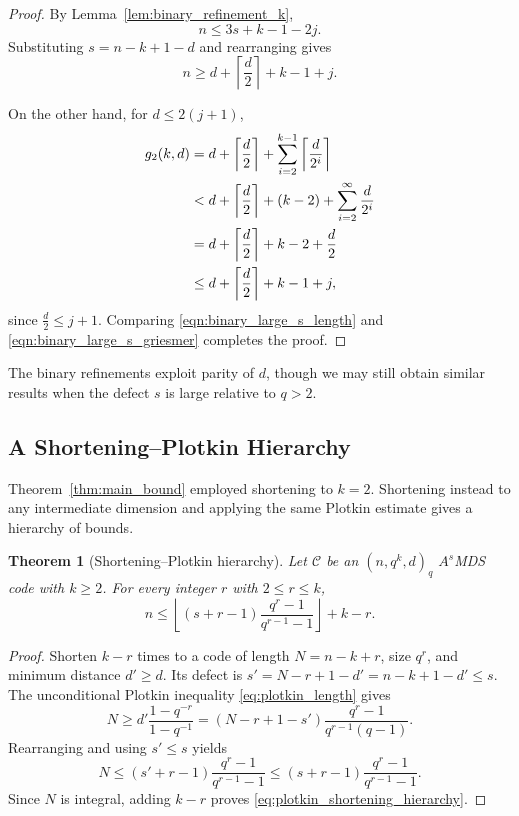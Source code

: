 \documentclass[12pt, letterpaper]{article}
\theoremstyle{plain}
\newtheorem{theorem}{Theorem}[section]
\theoremstyle{definition}
\begin{document}
\begin{proof}
	By Lemma~\ref{lem:binary_refinement_k},
	\[
	n \le 3s + k - 1 - 2j.
	\]
	Substituting $s = n - k + 1 - d$ and rearranging gives
	\begin{equation}\label{eqn:binary_large_s_length}
	n \ge d + \left\lceil\frac{d}{2}\right\rceil + k - 1 + j.
	\end{equation}

	On the other hand, for $d \le 2(j+1)$,
	\begin{align}
		g_2(k,d) &= d + \left\lceil\frac{d}{2}\right\rceil + \sum_{i=2}^{k-1} \left\lceil\frac{d}{2^i}\right\rceil \notag\\
		&< d + \left\lceil\frac{d}{2}\right\rceil + (k-2) + \sum_{i=2}^\infty \frac{d}{2^i} \notag\\
		&= d + \left\lceil\frac{d}{2}\right\rceil + k - 2 + \frac{d}{2} \notag\\
		&\le d + \left\lceil\frac{d}{2}\right\rceil + k - 1 + j, \label{eqn:binary_large_s_griesmer}
	\end{align}
	since $\frac{d}{2} \le j+1$. Comparing \eqref{eqn:binary_large_s_length} and \eqref{eqn:binary_large_s_griesmer} completes the proof.
\end{proof}

	The binary refinements exploit parity of $d$, though we may still obtain similar results when the defect $s$ is large relative to $q>2$.
	
	\subsection{A Shortening--Plotkin Hierarchy}
	\label{sec:large_defect}
	
	 Theorem~\ref{thm:main_bound} employed shortening to $k=2$. Shortening instead to any intermediate dimension and applying the same Plotkin estimate gives a hierarchy of bounds.

	\begin{theorem}[Shortening--Plotkin hierarchy]\label{thm:plotkin_shortening_hierarchy}
		Let $\mathcal C$ be an $(n,q^k,d)_q$ $A^s$MDS code with $k\ge2$. For every integer $r$ with $2\le r\le k$,
		\begin{equation}\label{eq:plotkin_shortening_hierarchy}
		 n\le
		 \left\lfloor (s+r-1)\frac{q^r-1}{q^{r-1}-1}\right\rfloor+k-r.
		\end{equation}
	\end{theorem}

	\begin{proof}
		Shorten $k-r$ times to a code of length $N=n-k+r$, size $q^r$, and minimum distance $d'\ge d$. Its defect is $s'=N-r+1-d'=n-k+1-d'\le s$. The unconditional Plotkin inequality \eqref{eq:plotkin_length} gives
		\[
		 N\ge d'\frac{1-q^{-r}}{1-q^{-1}}
		   =(N-r+1-s')\frac{q^r-1}{q^{r-1}(q-1)}.
		\]
		Rearranging and using $s'\le s$ yields
		\[
		 N\le (s'+r-1)\frac{q^r-1}{q^{r-1}-1}
		 \le (s+r-1)\frac{q^r-1}{q^{r-1}-1}.
		\]
		Since $N$ is integral, adding $k-r$ proves \eqref{eq:plotkin_shortening_hierarchy}.
	\end{proof}
\end{document}
